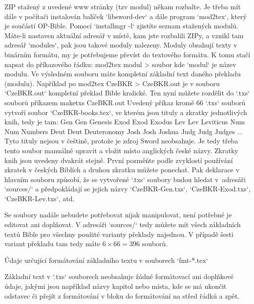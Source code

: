 ZIP stažený z uvedené www stránky (tzv modul) někam rozbalte. Je třeba
mít dále v počítači instalován balíček `libsword-dev` a dále program
`mod2tex`, který je součástí OP-Bible. Pomocí `installmgr -l` zjistíte
seznam stažených modulů. Máte-li nastaven aktuální adresář v místě, kam jste
rozbalili ZIPy, a vznikl tam adresář `modules`, pak jsou takové moduly
nalezeny. Moduly obsahují texty v binárním formátu, my je potřebujeme
převíst do textového formátu. K tomu stačí napsat do příkazového řádku: 
\begtt 
mod2tex modul > soubor
\endtt 
kde `modul` je název modulu. Ve výsledném souboru
máte kompletní základní text daného překladu (modulu).
Například po
\begtt
mod2tex CzeBKR > CzeBKR.out
\endtt
je v souboru `CzeBKR.out` kompletní překlad Bible kralické.
Ten nyní můžete rozdělit do `.txs` souborů příkazem
\begtt
maketxs CzeBKR.out
\endtt
Uvedený příkaz kromě 66 `.txs` souborů vytvoří soubor `CzeBKR-books.tex`, ve
kterém jsou tituly a zkratky jednotlivých knih, tedy je tam:
\begtt
\BookTitle Gen Gen {Genesis}
\BookTitle Exod Exod {Exodus}
\BookTitle Lev Lev {Leviticus}
\BookTitle Num Num {Numbers}
\BookTitle Deut Deut {Deuteronomy}
\BookTitle Josh Josh {Joshua}
\BookTitle Judg Judg {Judges}
...
\endtt
Tyto tituly nejsou v češtině, protože je zdroj Sword neobsahuje. Je tedy
třeba tento soubor manuálně upravit a vložit místo anglických české názvy.
Zkratky knih jsou uvedeny dvakrát stejně. První pozměňte podle zvyklostí
používání zkratek v českých Biblích a druhou zkratku můžete ponechat.
Pak deklarace 
\begtt
\def\txsfile  {sources/Cze\tmark-\bmark.txs}
\endtt
v hlavním souboru způsobí, že se vytvořené `.txs` soubory budou hledat 
v~adresáři `sources/` a předpokládají se jejich názvy
`CzeBKR-Gen.txs`, `CzeBKR-Exod.txs`, `CzeBKR-Lev.txs`, atd.

Se soubory nadále nebudete
potřebovat nijak manipulovat, není potřebné je editovat ani doplňovat. V
adresáři `sources/` tedy můžete mít  všech základních textů
Bible pro všechny použité varianty překlady najednou. V případě šesti variant
překladu tam tedy máte $6\times66=396$ souborů.


\secc[fmt] Údaje určující formátování základního textu v souborech `fmt-*.tex`

Základní text v `.txs` souborech neobsahuje
žádné formátovací ani doplňkové údaje, jakými jsou například názvy kapitol
nebo místa, kde se má ukončit odstavec či přejít z formátování v bloku do
formátování na střed řádků a zpět.

